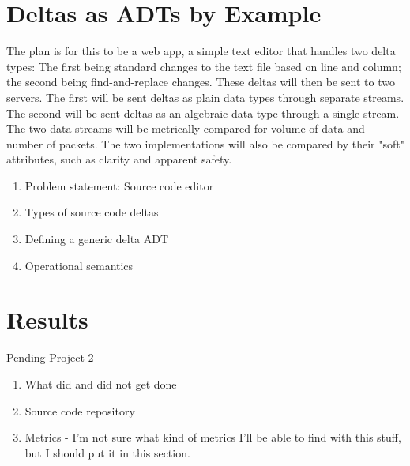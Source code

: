 \documentclass[12pt,a4paper]{article}
\begin{document}
	\section{Deltas as ADTs by Example}
	
		The plan is for this to be a web app, a simple text editor that handles two delta types: The first being standard changes to the text file based on line and column; the second being find-and-replace changes. These deltas will then be sent to two servers. The first will be sent deltas as plain data types through separate streams. The second will be sent deltas as an algebraic data type through a single stream. The two data streams will be metrically compared for volume of data and number of packets. The two implementations will also be compared by their "soft" attributes, such as clarity and apparent safety.
			
		\begin{enumerate}
			\item Problem statement: Source code editor
			\item Types of source code deltas
			\item Defining a generic delta ADT
			\item Operational semantics
		\end{enumerate}
		
		
	\section{Results}
		Pending Project 2
				\begin{enumerate}
					\item What did and did not get done
					\item Source code repository
					\item Metrics - I'm not sure what kind of metrics I'll be able to find with this stuff, but I should put it in this section.
				\end{enumerate}
\end{document}
